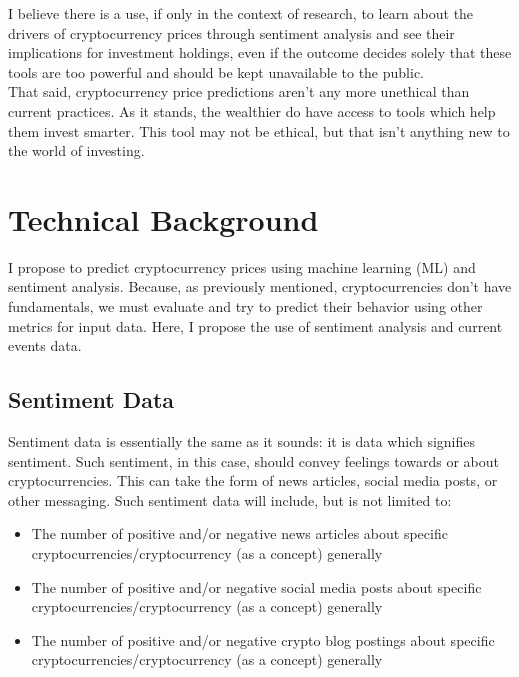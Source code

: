 \documentclass{article}
\begin{document}
I believe there is a use, if only in the context of research, to learn about the drivers of cryptocurrency prices through sentiment analysis and see their implications for investment holdings, even if the outcome decides solely that these tools are too powerful and should be kept unavailable to the public. \\

That said, cryptocurrency price predictions aren't any more unethical than current practices. As it stands, the wealthier do have access to tools which help them invest smarter. This tool may not be ethical, but that isn't anything new to the world of investing.


\section{Technical Background}
\label{sec:technical}

I propose to predict cryptocurrency prices using machine learning (ML) and sentiment analysis. Because, as previously mentioned, cryptocurrencies don’t have fundamentals, we must evaluate and try to predict their behavior using other metrics for input data. Here, I propose the use of sentiment analysis and current events data.

\subsection{Sentiment Data}
\label{sec:sentiment}

Sentiment data is essentially the same as it sounds: it is data which signifies sentiment. Such sentiment, in this case, should convey feelings towards or about cryptocurrencies. This can take the form of news articles, social media posts, or other messaging. Such sentiment data will include, but is not limited to:

\begin{itemize}
    \item The number of positive and/or negative news articles about specific cryptocurrencies/cryptocurrency (as a concept) generally
    \item The number of positive and/or negative social media posts about specific cryptocurrencies/cryptocurrency (as a concept) generally
    \item The number of positive and/or negative crypto blog postings about specific cryptocurrencies/cryptocurrency (as a concept) generally

\end{itemize}
\end{document}
